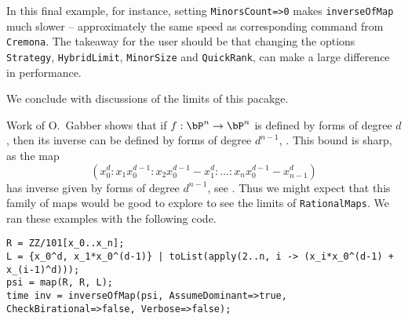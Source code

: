 \documentclass[11pt]{amsart}
\numberwithin{equation}{theorem}
\renewcommand{\:}{\colon}
\theoremstyle{theorem}
\begin{document}
{\color{black}\normalsize
In this final example, for instance, setting {\tt MinorsCount=>0} makes {\tt inverseOfMap} much slower -- approximately the same speed as corresponding command from {\tt Cremona}.
The takeaway for the user should be that changing the options {\tt Strategy}, {\tt HybridLimit}, {\tt MinorSize} and {\tt QuickRank}, can make a large difference in performance.


We conclude with discussions of the limits of this pacakge.

 Work of O.~Gabber shows that if $f : \bP^n \to \bP^n$ is defined by forms of degree $d$, then its inverse can be defined by forms of degree $d^{n-1}$, \cite{BassConnellWrightJacobianConjecture}.  This bound is sharp, as the map
    \[
        (x_0^d : x_1 x_0^{d-1} : x_2 x_0^{d-1} - x_1^d : \dots : x_n x_0^{d-1} - x_{n-1}^d)
    \]
    has inverse given by forms of degree $d^{n-1}$, see \cite{HassanzadehSimisBoundsOnDegreesOfBirat}.  Thus we might expect that this family of maps would be good to explore to see the limits of {\tt RationalMaps}.  We ran these examples with the following code.
}
{\scriptsize
\color{blue}
\begin{verbatim}
R = ZZ/101[x_0..x_n];
L = {x_0^d, x_1*x_0^(d-1)} | toList(apply(2..n, i -> (x_i*x_0^(d-1) + x_(i-1)^d)));
psi = map(R, R, L);
time inv = inverseOfMap(psi, AssumeDominant=>true, CheckBirational=>false, Verbose=>false);
\end{verbatim}%
}%
\end{document}
